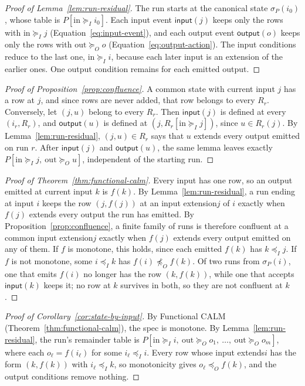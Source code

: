 \documentclass[sigconf]{cidr-2027}
\theoremstyle{remark}
\newcommand{\InputOrd}{\preceq_I}
\newcommand{\OutputOrd}{\preceq_O}
\newcommand{\InputGe}{\succeq_I}
\newcommand{\OutputGe}{\succeq_O}
\newcommand{\inrel}{extends\xspace}          %
\newcommand{\indesc}{input extension\xspace} %
\newcommand{\outrel}{extends\xspace}          %
\begin{document}
\begin{proof}[Proof of Lemma~\ref{lem:run-residual}]
The run starts at the canonical state $\sigma_P(i_0)$, whose table is
$P[\mathrm{in}\InputGe i_0]$. Each input event $\mathsf{input}(j)$ keeps only
the rows with $\mathrm{in}\InputGe j$ (Equation~\ref{eq:input-event}), and each
output event $\mathsf{output}(o)$ keeps only the rows with
$\mathrm{out}\OutputGe o$ (Equation~\ref{eq:output-action}). The input
conditions reduce to the last one, $\mathrm{in}\InputGe i$, because each later
input is an extension of the earlier ones. One output condition remains for each
emitted output.
\end{proof}

\begin{proof}[Proof of Proposition~\ref{prop:confluence}]
A common state with current input $j$ has a row at $j$, and since rows are
never added, that row belongs to every $R_r$.  Conversely, let $(j,u)$ belong
to every $R_r$.  Then $\mathsf{input}(j)$ is defined at every $(i_r,R_r)$, and
$\mathsf{output}(u)$ is defined at $(j,R_r[\mathrm{in}\InputGe j])$, since
$u\in R_r(j)$.  By
Lemma~\ref{lem:run-residual}, $(j,u)\in R_r$ says that $u$ \outrel every output
emitted on run $r$.  After $\mathsf{input}(j)$ and $\mathsf{output}(u)$, the
same lemma leaves exactly
$P[\mathrm{in}\InputGe j,\ \mathrm{out}\OutputGe u]$, independent of the
starting run.
\end{proof}

\begin{proof}[Proof of Theorem~\ref{thm:functional-calm}]
Every input has one row, so an output emitted at current input $k$ is $f(k)$.
By Lemma~\ref{lem:run-residual}, a run ending at input $i$ keeps the
row $(j,f(j))$ at an \indesc $j$ of $i$ exactly when $f(j)$ \outrel every
output the run has emitted.  By Proposition~\ref{prop:confluence}, a finite
family of runs is therefore confluent at a common \indesc $j$ exactly
when $f(j)$ \outrel every output emitted on any of them.  If $f$ is monotone,
this holds, since each emitted $f(k)$ has $k\InputOrd j$.  If $f$ is not
monotone, some $i\InputOrd k$ has $f(i)\not\OutputOrd f(k)$.  Of two
runs from $\sigma_P(i)$, one that emits $f(i)$ no longer has the row
$(k,f(k))$, while one that accepts $\mathsf{input}(k)$ keeps it; no row at $k$
survives in both, so they are not confluent at $k$.
\end{proof}

\begin{proof}[Proof of Corollary~\ref{cor:state-by-input}]
By Functional CALM (Theorem~\ref{thm:functional-calm}), the spec is
monotone.  By Lemma~\ref{lem:run-residual}, the run's remainder table is
$P[\mathrm{in}\InputGe i,\ \mathrm{out}\OutputGe o_1,\ \ldots,\
\mathrm{out}\OutputGe o_m]$, where each $o_\ell=f(i_\ell)$ for some
$i_\ell\InputOrd i$.  Every row whose input \inrel $i$ has the form $(k,f(k))$ with
$i_\ell\InputOrd k$, so monotonicity gives $o_\ell\OutputOrd f(k)$, and the
output conditions remove nothing.
\end{proof}
\end{document}
